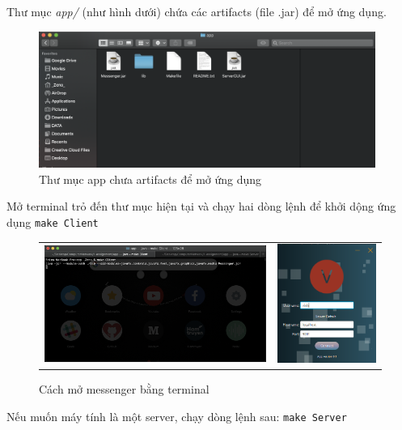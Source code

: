 \documentclass[a4paper]{article}
\begin{document}
Thư mục {\it app/} (như hình dưới) chứa các artifacts (file .jar) để mở ứng dụng. 

\begin{figure}[h!]
	\centering
	\includegraphics[width=11cm]{app-folder}
	\caption{Thư mục app chưa artifacts để mở ứng dụng}
\end{figure}

Mở terminal trỏ đến thư mục hiện tại và chạy hai dòng lệnh để khởi dộng ứng dụng {\tt make Client} 

\begin{figure}[h!]
	\centering
	\begin{tabular}{c c}
	\includegraphics[width=9cm]{messenger-terminal} &
	\includegraphics[width=4cm]{LogIn}
	\end{tabular}
	\caption{Cách mở messenger bằng terminal}
\end{figure}

Nếu muốn máy tính là một server, chạy dòng lệnh sau: {\tt make Server}
\end{document}
